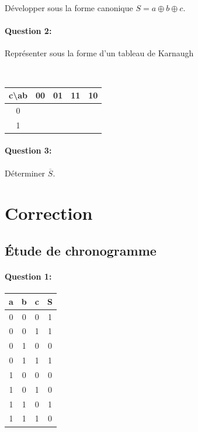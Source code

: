 Développer sous la forme canonique $S= a \oplus b \oplus c$.

\paragraph{Question 2:}

Représenter sous la forme d'un tableau de Karnaugh

~\

\begin{center}
\begin{tabular}{|c|c|c|c|c|}
\hline
c\textbackslash ab & 00 & 01 & 11 & 10 \\
\hline
0  &    &    &    &    \\
\hline
1  &    &    &    & \\
\hline
\end{tabular} 
\end{center}

\paragraph{Question 3:}

Déterminer $\overline{S}$.

\clearpage

\ifdef{\public}{}{}

\newpage

\pagestyle{correction}

\section{Correction}

\subsection{Étude de chronogramme}

\paragraph{Question 1:}

 \begin{center}
 \begin{tabular}{|c|c|c|c|}
 \hline
 a & b & c & S \\
 \hline
 0  & 0  & 0  & 1 \\
 \hline
 0  & 0  & 1  & 1 \\
 \hline
 0  & 1  & 0  & 0 \\
 \hline
 0  & 1  & 1  & 1 \\
 \hline
 1  & 0  & 0  & 0 \\
 \hline
 1  & 0  & 1  & 0 \\
 \hline
 1  & 1  & 0  & 1 \\
 \hline
 1  & 1  & 1  & 0 \\
 \hline
 \end{tabular}
 \end{center}

